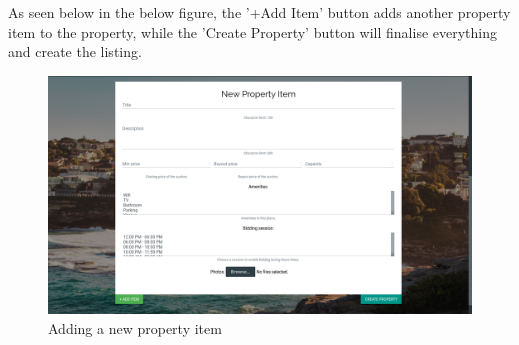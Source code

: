 As seen below in the below figure, the '+Add Item' button adds another property
item to the property, while the 'Create Property' button will finalise everything
and create the listing. 

\begin{figure}[!h]
  \includegraphics[width=\linewidth]{assets/userManual/newPropertyItem.png}
  \caption{Adding a new property item}
  \label{fig:newPropertyItem}
\end{figure}